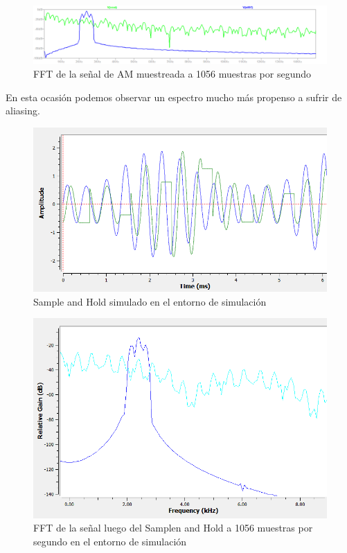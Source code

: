 \begin{figure}[H]
	\centering
	\includegraphics[width=\linewidth]{ImagenesEjercicio8/FFT1056_SampleHold}
	\caption{FFT de la señal de AM muestreada a 1056 muestras por segundo}
	\label{fig:fft1056samplehold}
\end{figure}
En esta ocasión podemos observar un espectro mucho más propenso a sufrir de aliasing. 

\begin{figure}[H]
	\centering
	\includegraphics[width=\linewidth]{ImagenesEjercicio8/Muestreo_SH_1056timeGNURADIO}
	\caption{Sample and Hold simulado en el entorno de simulación}
	\label{fig:muestreosh1056timegnuradio}
\end{figure}

\begin{figure}[H]
	
	\centering
	\includegraphics[width=\linewidth]{ImagenesEjercicio8/FFT1056_SH_GNURADIO}
	\caption{FFT de la señal luego del Samplen and Hold a 1056 muestras por segundo en el entorno de simulación}
	\label{fig:fft1056shgnuradio}
\end{figure}

